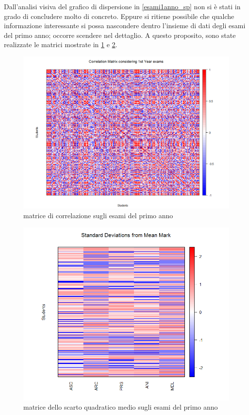 Dall’analisi visiva del grafico di dispersione in \ref{esami1anno_sp} non si è stati in grado di concludere molto di concreto. Eppure si ritiene possibile che qualche informazione interessante si possa nascondere dentro l’insieme di dati degli esami del primo anno; occorre scendere nel dettaglio. A questo proposito, sono state realizzate le matrici mostrate in \ref{esami1anno_corr} e \ref{esami1anno_stddev}.

\begin{figure}
    \centering
    \caption{matrice di correlazione sugli esami del primo anno}
    \label{esami1anno_corr}
	\includegraphics[scale=0.32]{img/corr_matrix_1.png}
\end{figure}

\begin{figure}
    \centering
    \caption{matrice dello scarto quadratico medio sugli esami del primo anno}
    \label{esami1anno_stddev}
	\includegraphics[scale=0.5]{img/std_dev_matrix_1.png}
\end{figure}

